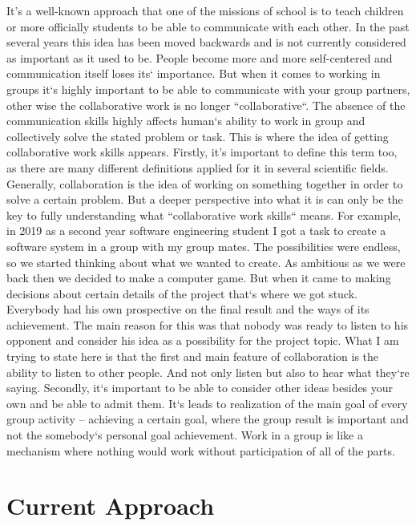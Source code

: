 \documentclass[10pt,twoside,English,a4paper]{article}
\begin{document}
It’s a well-known approach that one of the missions of school is to teach children or more officially students to be able to communicate with each other. In the past several years this idea has been moved backwards and is not currently considered as important as it used to be. People become more and more self-centered and communication itself loses its` importance. But when it comes to working in groups it`s highly important to be able to communicate with your group partners, other wise the collaborative work is no longer ``collaborative``. The absence of the communication skills highly affects human`s ability to work in group and collectively solve the stated problem or task. This is where the idea of getting collaborative work skills appears.
Firstly, it’s important to define this term too, as there are many different definitions applied for it in several scientific fields. Generally, collaboration is the idea of working on something together in order to solve a certain problem. But a deeper perspective into what it is can only be the key to fully understanding what ``collaborative work skills`` means. For example, in 2019 as a second year software engineering student I got a task to create a software system in a group with my group mates. The possibilities were endless, so we started thinking about what we wanted to create. As ambitious as we were back then we decided to make a computer game. But when it came to making decisions about certain details of the project that`s where we got stuck. Everybody had his own prospective on the final result and the ways of its achievement. The main reason for this was that nobody was ready to listen to his opponent and consider his idea as a possibility for the project topic. What I am trying to state here is that the first and main feature of collaboration is the ability to listen to other people. And not only listen but also to hear what they`re saying. Secondly, it`s important to be able to consider other ideas besides your own and be able to admit them. It`s leads to realization of the main goal of every group activity – achieving a certain goal, where the group result is important and not the somebody`s personal goal achievement. Work in a group is like a mechanism where nothing would work without participation of all of the parts.

\section{Current Approach} \label{curr}
\end{document}
